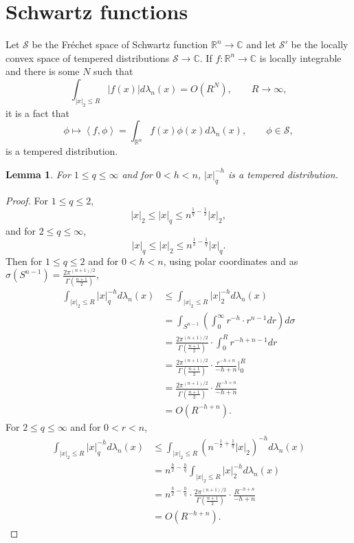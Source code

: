 \documentclass{article}
\newcommand{\inner}[2]{\left\langle #1, #2 \right\rangle}
\newtheorem{lemma}[theorem]{Lemma}
\theoremstyle{definition}
\begin{document}
\section{Schwartz functions}
Let $\mathscr{S}$ be the Fr\'echet space of Schwartz function $\mathbb{R}^n \to \mathbb{C}$ and let
$\mathscr{S}'$ be the locally convex space of tempered distributions $\mathscr{S} \to \mathbb{C}$. 
If $f:\mathbb{R}^n \to \mathbb{C}$ is locally integrable and there is some $N$ such that
\[
\int_{|x|_2 \leq R} |f(x)| d\lambda_n(x) = O(R^N),\qquad R \to \infty,
\]
it is a fact that
\[
\phi \mapsto \inner{f}{\phi} = \int_{\mathbb{R}^n} f(x) \phi(x) d\lambda_n(x),\qquad \phi \in \mathscr{S},
\]
is a tempered distribution. 

\begin{lemma}
For $1 \leq q \leq \infty$ and for $0<h<n$, 
$|x|_q^{-h}$ is a tempered distribution. 
\end{lemma}
\begin{proof}
For $1 \leq q \leq 2$, 
\[
|x|_2 \leq |x|_q \leq n^{\frac{1}{q}-\frac{1}{2}} |x|_2,
\]
and for $2 \leq q \leq \infty$,
\[
|x|_q \leq |x|_2 \leq n^{\frac{1}{2}-\frac{1}{q}} |x|_q.
\]
Then
for $1 \leq q \leq 2$ and for $0<h<n$, using polar coordinates and as $\sigma(S^{n-1}) = \frac{2\pi^{(n+1)/2}}{\Gamma(\frac{n+1}{2})}$,
\begin{align*}
\int_{|x|_2 \leq R} |x|_q^{-h} d\lambda_n(x)&\leq \int_{|x|_2 \leq R} |x|_2^{-h} d\lambda_n(x)\\
&=\int_{S^{n-1}} \left( \int_0^\infty r^{-h} \cdot r^{n-1} dr \right) d\sigma\\
&=\frac{2\pi^{(n+1)/2}}{\Gamma(\frac{n+1}{2})} \cdot \int_0^R r^{-h+n-1} dr \\
&=\frac{2\pi^{(n+1)/2}}{\Gamma(\frac{n+1}{2})} \cdot \frac{r^{-h+n}}{-h+n} \bigg|_0^R\\
&=\frac{2\pi^{(n+1)/2}}{\Gamma(\frac{n+1}{2})} \cdot \frac{R^{-h+n}}{-h+n}\\
&=O(R^{-h+n}).
\end{align*}
For $2 \leq q \leq \infty$ and for $0<r<n$, 
\begin{align*}
\int_{|x|_2 \leq R} |x|_q^{-h} d\lambda_n(x)&\leq \int_{|x|_2 \leq R} (n^{-\frac{1}{2}+\frac{1}{q}} |x|_2)^{-h} d\lambda_n(x)\\
&=n^{\frac{h}{2} - \frac{h}{q}} \int_{|x|_2 \leq R} |x|_2^{-h} d\lambda_n(x)\\
&=n^{\frac{h}{2} - \frac{h}{q}}  \cdot \frac{2\pi^{(n+1)/2}}{\Gamma(\frac{n+1}{2})} \cdot \frac{R^{-h+n}}{-h+n}\\
&=O(R^{-h+n}).
\end{align*}
\end{proof}
\end{document}
